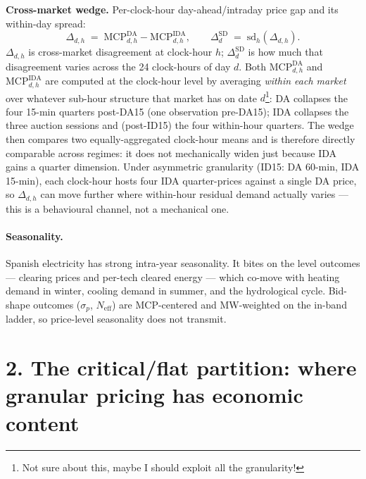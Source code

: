 \documentclass[11pt]{article}
\begin{document}
\textbf{Cross-market wedge.} Per-clock-hour day-ahead/intraday price gap and its within-day spread:
\[
\Delta_{d,h} \;=\; \text{MCP}^{\text{DA}}_{d,h} - \text{MCP}^{\text{IDA}}_{d,h}, \qquad
\Delta^{\text{SD}}_d \;=\; \mathrm{sd}_h(\Delta_{d,h}).
\]
$\Delta_{d,h}$ is cross-market disagreement at clock-hour $h$; $\Delta^{\text{SD}}_d$ is how much that disagreement varies across the 24 clock-hours of day $d$. Both $\text{MCP}^{\text{DA}}_{d,h}$ and $\text{MCP}^{\text{IDA}}_{d,h}$ are computed at the clock-hour level by averaging \emph{within each market} over whatever sub-hour structure that market has on date $d$\footnote{Not sure about this, maybe I should exploit all the granularity!}: DA collapses the four 15-min quarters post-DA15 (one observation pre-DA15); IDA collapses the three auction sessions and (post-ID15) the four within-hour quarters. The wedge then compares two equally-aggregated clock-hour means and is therefore directly comparable across regimes: it does not mechanically widen just because IDA gains a quarter dimension. Under asymmetric granularity (ID15: DA 60-min, IDA 15-min), each clock-hour hosts four IDA quarter-prices against a single DA price, so $\Delta_{d,h}$ can move further where within-hour residual demand actually varies --- this is a behavioural channel, not a mechanical one.

\paragraph{Seasonality.} Spanish electricity has strong intra-year seasonality. It bites on the level outcomes --- clearing prices and per-tech cleared energy --- which co-move with heating demand in winter, cooling demand in summer, and the hydrological cycle. Bid-shape outcomes ($\sigma_p$, $N_{\text{eff}}$) are MCP-centered and MW-weighted on the in-band ladder, so price-level seasonality does not transmit.
\vspace{6pt}

\section*{2. The critical/flat partition: where granular pricing has economic content}
\label{sec:partition}
\end{document}
